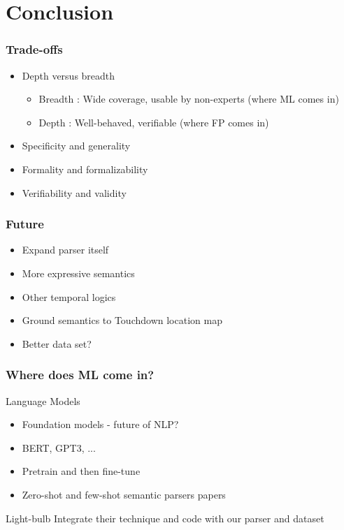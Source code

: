 \documentclass{beamer}
\begin{document}
\begin{frame}

\end{frame}

\section{Conclusion}

\begin{frame}
\frametitle{Trade-offs}
\begin{itemize}[<+->]
\item Depth versus breadth
\begin{itemize}[<+->]
\item Breadth : Wide coverage, usable by non-experts (where ML comes in)
\item Depth   : Well-behaved, verifiable (where FP comes in)
\end{itemize}
\item Specificity and generality
\item Formality and formalizability
\item Verifiability and validity
\end{itemize}
\end{frame}

\begin{frame}
\frametitle{Future}
\begin{itemize}[<+->]
\item Expand parser itself
\item More expressive semantics
\item Other temporal logics
\item Ground semantics to Touchdown location map
\item Better data set?
\end{itemize} 
\end{frame}

\begin{frame}
\frametitle{Where does ML come in?}

\begin{exampleblock}{Language Models}
\begin{itemize}[<+->]
\item Foundation models - future of NLP?
\item BERT, GPT3, ...
\item Pretrain and then fine-tune
\item Zero-shot and few-shot semantic parsers papers
\end{itemize}
\end{exampleblock}
\pause
\begin{alertblock}{Light-bulb}
Integrate their technique and code with our parser and dataset
\end{alertblock}

\end{frame}
\end{document}
